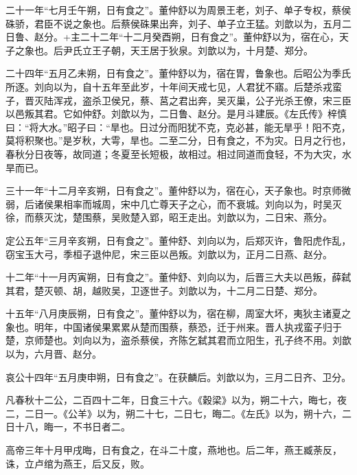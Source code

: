 \documentclass[12pt,UTF8]{ctexbook}
\begin{document}
二十一年“七月壬午朔，日有食之”。董仲舒以为周景王老，刘子、单子专权，蔡侯硃骄，君臣不说之象也。后蔡侯硃果出奔，刘子、单子立王猛。刘歆以为，五月二日鲁、赵分。+主二十二年“十二月癸酉朔，日有食之”。董仲舒以为，宿在心，天子之象也。后尹氏立王子朝，天王居于狄泉。刘歆以为，十月楚、郑分。



二十四年“五月乙未朔，日有食之”。董仲舒以为，宿在胃，鲁象也。后昭公为季氏所逐。刘向以为，自十五年至此岁，十年间天戒七见，人君犹不寤。后楚杀戎蛮子，晋灭陆浑戎，盗杀卫侯兄，蔡、莒之君出奔，吴灭巢，公子光杀王僚，宋三臣以邑叛其君。它如仲舒。刘歆以为，二日鲁、赵分。是月斗建辰。《左氏传》梓慎曰：“将大水。”昭子曰：“旱也。日过分而阳犹不克，克必甚，能无旱乎！阳不克，莫将积聚也。”是岁秋，大雩，旱也。二至二分，日有食之，不为灾。日月之行也，春秋分日夜等，故同道；冬夏至长短极，故相过。相过同道而食轻，不为大灾，水旱而已。



三十一年“十二月辛亥朔，日有食之”。董仲舒以为，宿在心，天子象也。时京师微弱，后诸侯果相率而城周，宋中几亡尊天子之心，而不衰城。刘向以为，时吴灭徐，而蔡灭沈，楚围蔡，吴败楚入郢，昭王走出。刘歆以为，二日宋、燕分。



定公五年“三月辛亥朔，日有食之”。董仲舒、刘向以为，后郑灭许，鲁阳虎作乱，窃宝玉大弓，季桓子退仲尼，宋三臣以邑叛。刘歆以为，正月二日燕、赵分。



十二年“十一月丙寅朔，日有食之”。董仲舒、刘向以为，后晋三大夫以邑叛，薛弑其君，楚灭顿、胡，越败吴，卫逐世子。刘歆以为，十二月二日楚、郑分。



十五年“八月庚辰朔，日有食之”。董仲舒以为，宿在柳，周室大坏，夷狄主诸夏之象也。明年，中国诸侯果累累从楚而围蔡，蔡恐，迁于州来。晋人执戎蛮子归于楚，京师楚也。刘向以为，盗杀蔡侯，齐陈乞弑其君而立阳生，孔子终不用。刘歆以为，六月晋、赵分。



哀公十四年“五月庚申朔，日有食之”。在获麟后。刘歆以为，三月二日齐、卫分。



凡春秋十二公，二百四十二年，日食三十六。《穀梁》以为，朔二十六，晦七，夜二，二日一。《公羊》以为，朔二十七，二日七，晦二。《左氏》以为，朔十六，二日十八，晦一，不书日者二。



高帝三年十月甲戌晦，日有食之，在斗二十度，燕地也。后二年，燕王臧荼反，诛，立卢绾为燕王，后又反，败。
\end{document}
